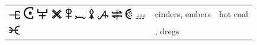 \documentclass[british,final,landscape]{scrartcl}
\begin{document}
\begin{refsection}
\begin{supertabular}{p{0.3\textwidth}p{0.34\textwidth}p{0.34\textwidth}}
   \includegraphics[width=5mm]{Mixtures/Cinders} \includegraphics[width=5mm]{Mixtures/Cinders2} \includegraphics[width=5mm]{Mixtures/Cinders3} \includegraphics[width=5mm]{Mixtures/Cinders4} \includegraphics[height=5mm]{Mixtures/Cinders5} \includegraphics[width=5mm]{Mixtures/Cinders6} \includegraphics[height=5mm]{Mixtures/Cinders7} \includegraphics[width=5mm]{Mixtures/Cinders8} \includegraphics[width=5mm]{Mixtures/Cinders9} \includegraphics[height=5mm]{Mixtures/Cinders10} \includegraphics[width=5mm]{Mixtures/Cinders11} & cinders, embers & hot coal \\
   \includegraphics[width=5mm]{Mixtures/Dregs} & , dregs & \\

\end{supertabular}
\end{refsection}
\end{document}
